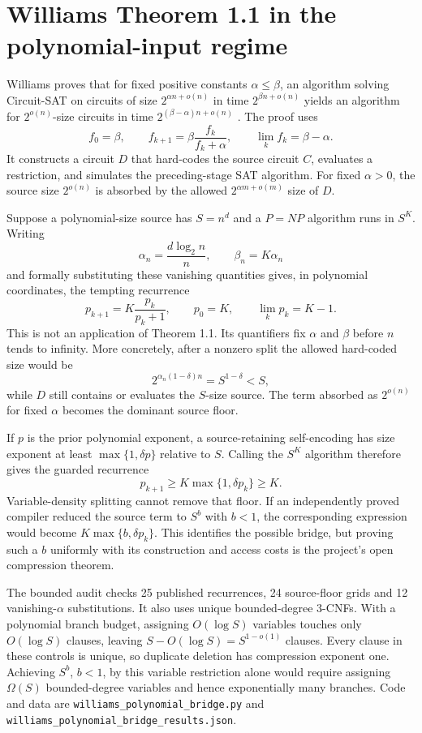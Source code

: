 \documentclass[11pt]{article}
\begin{document}
\section{Williams Theorem 1.1 in the polynomial-input regime}
Williams proves that for fixed positive constants $\alpha\le\beta$, an
algorithm solving Circuit-SAT on circuits of size
$2^{\alpha n+o(n)}$ in time $2^{\beta n+o(n)}$ yields an algorithm for
$2^{o(n)}$-size circuits in time
$2^{(\beta-\alpha)n+o(n)}$ \cite{williams2024}.  The proof uses
\[
 f_0=\beta,
 \qquad
 f_{k+1}=\beta\frac{f_k}{f_k+\alpha},
 \qquad
 \lim_k f_k=\beta-\alpha.
\]
It constructs a circuit $D$ that hard-codes the source circuit $C$, evaluates a
restriction, and simulates the preceding-stage SAT algorithm.  For fixed
$\alpha>0$, the source size $2^{o(n)}$ is absorbed by the allowed
$2^{\alpha m+o(m)}$ size of $D$.

Suppose a polynomial-size source has $S=n^d$ and a $P=NP$ algorithm runs in
$S^K$.  Writing
\[
 \alpha_n=\frac{d\log_2 n}{n},\qquad \beta_n=K\alpha_n
\]
and formally substituting these vanishing quantities gives, in polynomial
coordinates, the tempting recurrence
\[
 p_{k+1}=K\frac{p_k}{p_k+1},
 \qquad p_0=K,
 \qquad \lim_kp_k=K-1.
\]
This is not an application of Theorem 1.1.  Its quantifiers fix $\alpha$ and
$\beta$ before $n$ tends to infinity.  More concretely, after a nonzero split
the allowed hard-coded size would be
\[
 2^{\alpha_n(1-\delta)n}=S^{1-\delta}<S,
\]
while $D$ still contains or evaluates the $S$-size source.  The term absorbed
as $2^{o(n)}$ for fixed $\alpha$ becomes the dominant source floor.

If $p$ is the prior polynomial exponent, a source-retaining self-encoding has
size exponent at least $\max\{1,\delta p\}$ relative to $S$.  Calling the
$S^K$ algorithm therefore gives the guarded recurrence
\[
 p_{k+1}\ge K\max\{1,\delta p_k\}\ge K.
\]
Variable-density splitting cannot remove that floor.  If an independently
proved compiler reduced the source term to $S^b$ with $b<1$, the corresponding
expression would become $K\max\{b,\delta p_k\}$.  This identifies the possible
bridge, but proving such a $b$ uniformly with its construction and access costs
is the project’s open compression theorem.

The bounded audit checks 25 published recurrences, 24 source-floor grids and
12 vanishing-$\alpha$ substitutions.  It also uses unique bounded-degree
3-CNFs.  With a polynomial branch budget, assigning $O(\log S)$ variables
touches only $O(\log S)$ clauses, leaving $S-O(\log S)=S^{1-o(1)}$ clauses.
Every clause in these controls is unique, so duplicate deletion has compression
exponent one.  Achieving $S^b$, $b<1$, by this variable restriction alone would
require assigning $\Omega(S)$ bounded-degree variables and hence exponentially
many branches.  Code and data are
\texttt{williams\_polynomial\_bridge.py} and
\texttt{williams\_polynomial\_bridge\_results.json}.
\end{document}
